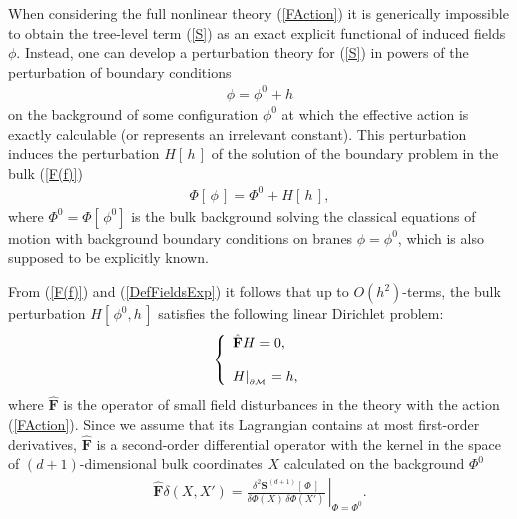\documentclass[a4paper,12pt]{article}
\newcommand{\DDim}{{(d+\!1)}}
\newcommand{\dM}{{\partial \cal M}}
\newcommand{\BBox}{\hat{\mathbf{F}}}  %
\begin{document}
When considering the full nonlinear theory (\ref{FAction}) it is
generically impossible to obtain the tree-level term (\ref{S}) as
an exact explicit functional of induced fields $\phi$. Instead,
one can develop a perturbation theory for (\ref{S}) in powers of
the perturbation of boundary conditions
    \begin{eqnarray}
    \phi=\phi^0+h                   \label{h}
    \end{eqnarray}
on the background of some configuration $\phi^0$ at which the
effective action is exactly calculable (or represents an
irrelevant constant). This perturbation induces the perturbation
$H[\,h\,]$ of the solution of the boundary problem in the
bulk (\ref{F(f)})
    \begin{eqnarray}
    \Phi[\,\phi\,]=
    \Phi^0+H[\,h\,],         \label{DefFieldsExp}
    \end{eqnarray}
where $\Phi^0=\Phi[\,\phi^0]$ is the bulk background solving the
classical equations of motion with background boundary conditions
on branes $\phi=\phi^0$, which is also supposed to be explicitly
known.

From (\ref{F(f)}) and (\ref{DefFieldsExp}) it follows that up to
$O(h^2)$-terms, the bulk perturbation $H[\,\phi^0,h\,]$ satisfies
the following linear Dirichlet problem:
    \begin{eqnarray}
    \left\{ \begin{array}{l}
    \BBox H=0, \\
    \\
    H|_{_{\dM}}=h,
     \end{array} \right.                      \label{dF(df)}
    \end{eqnarray}
where $\BBox$ is the operator of small field disturbances in the
theory with the action (\ref{FAction}). Since we assume that its
Lagrangian contains at most first-order derivatives, $\BBox$ is a
second-order differential operator with the kernel in the space of
$(d+1)$-dimensional bulk coordinates $X$ calculated on the
background $\Phi^0$
    \begin{eqnarray}
    \BBox\delta(X,X')=
    \left.\frac{\delta^2 \mathbf{S}^{\DDim}[\,\Phi\,]}{\delta
    \Phi(X)\,\delta\Phi(X')}\,\right|_{\Phi=\Phi^0}.
    \end{eqnarray}
\end{document}
